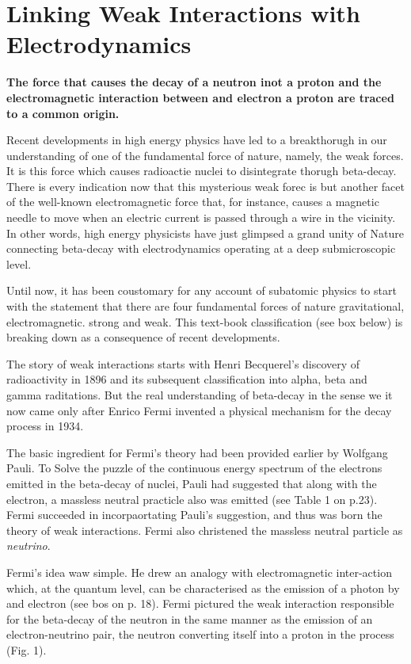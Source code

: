 \chapter{Linking Weak Interactions with Electrodynamics}

\authinfo{}

{\bf The force that causes the decay of a neutron inot a proton and the electromagnetic interaction between and electron a proton are traced to a common origin.}

Recent developments in high energy physics have led to a breakthorugh in our understanding of one of the fundamental force of nature, namely, the weak forces. It is this force which causes radioactie nuclei to disintegrate thorugh beta-decay. There is every indication now that this mysterious weak forec is but another facet of the well-known electromagnetic force that, for instance, causes a magnetic needle to move when an electric current is passed through a wire in the vicinity. In other words, high energy physicists have just glimpsed a grand unity of Nature connecting beta-decay with electrodynamics operating at a deep submicroscopic level.

Until now, it has been coustomary for any account of subatomic physics to start with the statement that there are four fundamental forces of nature gravitational, electromagnetic. strong and weak. This text-book classification (see box below) is breaking down as a consequence of recent developments.

The story of weak interactions starts with Henri Becquerel's discovery of radioactivity in 1896 and its subsequent classification into alpha, beta and gamma raditations. But the real understanding of beta-decay in the sense we it now came only after Enrico Fermi invented a physical mechanism for the decay process in 1934.

The basic ingredient for Fermi's theory had been provided earlier by Wolfgang Pauli. To Solve the puzzle of the continuous energy spectrum of the electrons emitted in the beta-decay of nuclei, Pauli had suggested that along with the electron, a massless neutral practicle also was emitted (see Table 1 on p.23). Fermi succeeded in incorpaortating Pauli's suggestion, and thus was born the theory of weak interactions. Fermi also christened the massless neutral particle as {\it neutrino}.

Fermi's idea waw simple. He drew an analogy with electromagnetic inter-action which, at the quantum level, can be characterised as the emission of a photon by and electron (see bos on p. 18). Fermi pictured the weak interaction responsible for the beta-decay of the neutron in the same manner as the emission of an electron-neutrino pair, the neutron converting itself into a proton in the process (Fig. 1).

